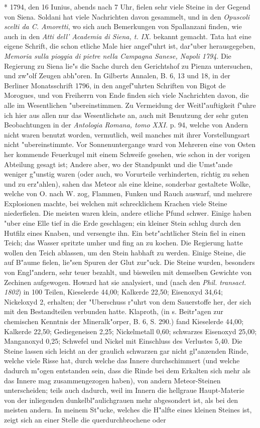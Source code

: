 \documentclass[a4paper, 11pt, oneside, polutonikogreek, german]{article}
\begin{document}
* 1794, den 16 Iunius, abends nach 7 Uhr, fielen sehr viele Steine in der Gegend von Siena. Soldani hat viele Nachrichten davon gesammelt, und in den \emph{Opuscoli scelti da C. Amoretti}, wo sich auch Bemerkungen von Spallanzani finden, wie auch in den \emph{Atti dell' Academia di Siena, t. IX.} bekannt gemacht. Tata hat eine eigene Schrift, die schon etliche Male hier angef"uhrt ist, dar"uber herausgegeben, \emph{Memoria sulla pioggia di pietre nella Campagna Sanese, Napoli 1794}. Die Regierung zu Siena lie"s die Sache durch den Gerichtshof zu Pienza untersuchen, und zw"olf Zeugen abh"oren. In Gilberts Annalen, B. 6, 13 und 18, in der Berliner Monatsschrift 1796, in den angef"uhrten Schriften von Bigot de Morogues, und von Freiherrn von Ende finden sich viele Nachrichten davon, die alle im Wesentlichen "ubereinstimmen. Zu Vermeidung der Weitl"auftigkeit f"uhre ich hier aus allen nur das Wesentlichste an, auch mit Benutzung der sehr guten Beobachtungen in der \emph{Antologia Romana, tomo XXI.} p. 94, welche von Andern nicht waren benutzt worden, vermutlich, weil manches mit ihrer Vorstellungsart nicht "ubereinstimmte. Vor Sonnenuntergange ward von Mehreren eine von Osten her kommende Feuerkugel mit einem Schweife gesehen, wie schon in der vorigen Abteilung gesagt ist; Andere aber, wo der Standpunkt und die Umst"ande weniger g"unstig waren (oder auch, wo Vorurteile verhinderten, richtig zu sehen und zu erz"ahlen), sahen das Meteor als eine kleine, sonderbar gestaltete Wolke, welche von O. nach W. zog, Flammen, Funken und Rauch auswarf, und mehrere Explosionen machte, bei welchen mit schrecklichem Krachen viele Steine niederfielen. Die meisten waren klein, andere etliche Pfund schwer. Einige haben "uber eine Elle tief in die Erde geschlagen; ein kleiner Stein schlug durch den Hutfilz eines Knaben, und versengte ihn. Ein betr"achtlicher Stein fiel in einen Teich; das Wasser spritzte umher und fing an zu kochen. Die Regierung hatte wollen den Teich ablassen, um den Stein habhaft zu werden. Einige Steine, die auf B"aume fielen, lie"sen Spuren der Glut zur"uck. Die Steine wurden, besonders von Engl"andern, sehr teuer bezahlt, und bisweilen mit demselben Gewichte von Zechinen aufgewogen. Howard hat sie analysiert, und (nach den \emph{Phil. transact. 1802}) in 100 Teilen, Kieselerde 44,00; Kalkerde 22,50; Eisenoxyd 34,64; Nickeloxyd 2, erhalten; der "Uberschuss r"uhrt von dem Sauerstoffe her, der sich mit den Bestandteilen verbunden hatte. Klaproth, (in s. Beitr"agen zur chemischen Kenntnis der Mineralk"orper, B. 6, S. 290.) fand Kieselerde 44,00; Kalkerde 22,50; Gediegeneisen 2,25; Nickelmetall 0,60; schwarzes Eisenoxyd 25,00; Manganoxyd 0,25; Schwefel und Nickel mit Einschluss des Verlustes 5,40. Die Steine lassen sich leicht an der graulich schwarzen gar nicht gl"anzenden Rinde, welche viele Risse hat, durch welche das Innere durchschimmert (und welche dadurch m"ogen entstanden sein, dass die Rinde bei dem Erkalten sich mehr als das Innere mag zusammengezogen haben), von andern Meteor-Steinen unterscheiden; teils auch dadurch, weil im Innern die hellgraue Haupt-Materie von der inliegenden dunkelbl"aulichgrauen mehr abgesondert ist, als bei den meisten andern. In meinem St"ucke, welches die H"alfte eines kleinen Steines ist, zeigt sich an einer Stelle die querdurchbrochene oder 
\end{document}
